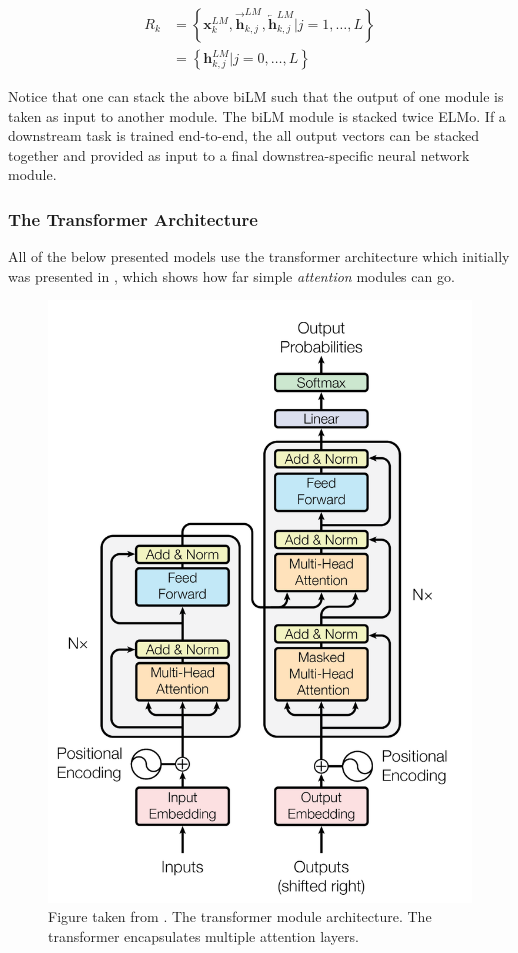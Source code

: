 \documentclass[a4paper,12pt,twoside,openright]{report}
\begin{document}
\begin{align} 
R_{k} &=\left\{\mathbf{x}_{k}^{L M}, \overrightarrow{\mathbf{h}}_{k, j}^{L M}, \overleftarrow{\mathbf{h}}_{k, j}^{L M} | j=1, \ldots, L\right\} \\ &=\left\{\mathbf{h}_{k, j}^{L M} | j=0, \ldots, L\right\} 
\end{align}

Notice that one can stack the above biLM such that the output of one module is taken as input to another module.
The biLM module is stacked twice ELMo.
If a downstream task is trained end-to-end, the all output vectors can be stacked together and provided as input to a final downstrea-specific neural network module.

\subsubsection{The Transformer Architecture}

All of the below presented models use the transformer architecture which initially was presented in \cite{vaswani17}, which shows how far simple \textit{attention} modules can go.


\begin{figure}[h]
	\center
  \includegraphics[width=0.6\linewidth]{./assets/background/transformer_module.png}
  \caption{Figure taken from \cite{vaswani17}. The transformer module architecture. The transformer encapsulates multiple attention layers.}
  \label{fig:cbow_skipgram}
\end{figure}
\end{document}
